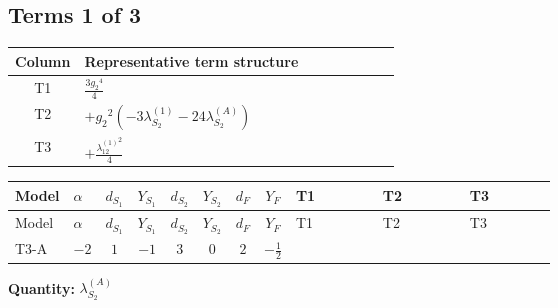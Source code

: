 \documentclass[8pt]{article}
\begin{document}
\begin{landscape}
\subsection*{Terms 1 of 3}
\begin{center}
\begin{tabular}{@{}c >{\raggedright\arraybackslash}p{0.82\linewidth}@{}}
\toprule
Column & Representative term structure \\
\midrule
T1 & \(\displaystyle \frac{3 {g_2}^4}{4}\) \\
\midrule
T2 & \(\displaystyle +{g_2}^2 (-3 {\lambda_{S_2}^{(1)}}-24 {\lambda_{S_2}^{(A)}})\) \\
\midrule
T3 & \(\displaystyle +\frac{{\lambda_{12}^{(1)}}^2}{4}\) \\
\midrule
\bottomrule
\end{tabular}
\end{center}
\smallskip
\tiny
\begin{longtable}{@{}llcccccc >{\raggedright\arraybackslash}p{0.21\linewidth} >{\raggedright\arraybackslash}p{0.21\linewidth} >{\raggedright\arraybackslash}p{0.21\linewidth}@{}}
\toprule
Model & $\alpha$ & $d_{S_1}$ & $Y_{S_1}$ & $d_{S_2}$ & $Y_{S_2}$ & $d_F$ & $Y_F$ & T1 & T2 & T3 \\
\midrule
\endfirsthead
\toprule
Model & $\alpha$ & $d_{S_1}$ & $Y_{S_1}$ & $d_{S_2}$ & $Y_{S_2}$ & $d_F$ & $Y_F$ & T1 & T2 & T3 \\
\midrule
\endhead
T3-A & $-2$ & $1$ & $-1$ & $3$ & $0$ & $2$ & $-\frac{1}{2}$ & \scriptsize\adjustbox{max width=\linewidth}{$\begin{gathered} \frac{3 {g_2}^4}{4}\end{gathered}$} & \scriptsize\adjustbox{max width=\linewidth}{$\begin{gathered} +{g_2}^2 (-3 {\lambda_{S_2}^{(1)}}-24 {\lambda_{S_2}^{(A)}})\end{gathered}$} & \scriptsize\adjustbox{max width=\linewidth}{$\begin{gathered} +\frac{{\lambda_{12}^{(1)}}^2}{4}\end{gathered}$} \\
\midrule
\bottomrule
\end{longtable}
\clearpage
\noindent\textbf{Quantity: }$\lambda_{S_2}^{(A)}$\par\smallskip

\end{landscape}
\end{document}
